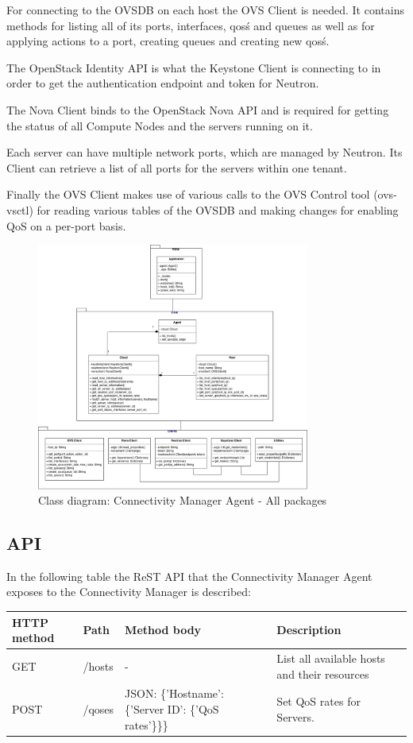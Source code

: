 For connecting to the OVSDB on each host the OVS Client is needed. It contains methods for listing all of its ports, interfaces, qos\'s and queues as well as for applying actions to a port, creating queues and creating new qos\'s.

The OpenStack Identity API is what the Keystone Client is connecting to in order to get the authentication endpoint and token for Neutron.

The Nova Client binds to the OpenStack Nova API and is required for getting the status of all Compute Nodes and the servers running on it.

Each server can have multiple network ports, which are managed by Neutron. Its Client can retrieve a list of all ports for the servers within one tenant.

Finally the OVS Client makes use of various calls to the OVS Control tool (ovs-vsctl) for reading various tables of the OVSDB and making changes for enabling QoS on a per-port basis.

\begin{figure}[H]
\centering

\includegraphics[width=0.8\textwidth]{images/design/cm_agent_class_diagram}

\caption{Class diagram: Connectivity Manager Agent - All packages}
\end{figure}



\subsection{API}

In the following table the ReST API that the Connectivity Manager Agent exposes to the Connectivity Manager is described:

\begin{tabularx}{\textwidth}{ |X|X|X|X| }
\hline HTTP method & Path & Method body & Description \\ 
\hline GET & /hosts & - & List all available hosts and their resources \\ 
\hline POST & /qoses & JSON: \{'Hostname': \{'Server ID': \{'QoS rates'\}\}\} & Set QoS rates for Servers. \\ 
\hline 
\end{tabularx}